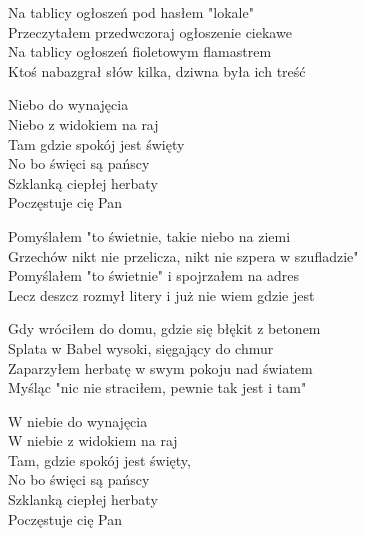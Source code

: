 \begin{text}
    \small{
    Na tablicy ogłoszeń pod hasłem "lokale"\\
    Przeczytałem przedwczoraj ogłoszenie ciekawe\\
    Na tablicy ogłoszeń fioletowym flamastrem\\
    Ktoś nabazgrał słów kilka, dziwna była ich treść

    \vin Niebo do wynajęcia\\
    \vin Niebo z widokiem na raj\\
    \vin Tam gdzie spokój jest święty\\
    \vin No bo święci są pańscy\\
    \vin Szklanką ciepłej herbaty\\
    \vin Poczęstuje cię Pan

    Pomyślałem "to świetnie, takie niebo na ziemi\\
    Grzechów nikt nie przelicza, nikt nie szpera w szufladzie"\\
    Pomyślałem "to świetnie" i spojrzałem na adres\\
    Lecz deszcz rozmył litery i już nie wiem gdzie jest

    Gdy wróciłem do domu, gdzie się błękit z betonem\\
    Splata w Babel wysoki, sięgający do chmur\\
    Zaparzyłem herbatę w swym pokoju nad światem\\
    Myśląc "nic nie straciłem, pewnie tak jest i tam"

    W niebie do wynajęcia\\
    W niebie z widokiem na raj\\
    Tam, gdzie spokój jest święty,\\
    No bo święci są pańscy\\
    Szklanką ciepłej herbaty\\
    Poczęstuje cię Pan
    }
\end{text}
\begin{chord}

\end{chord}